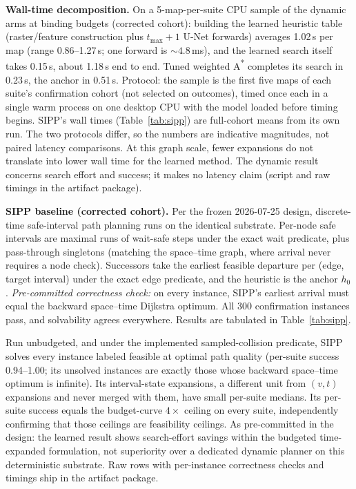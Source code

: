 \documentclass[letterpaper]{article} %
\begin{document}
\textbf{Wall-time decomposition.} On a 5-map-per-suite CPU sample of the dynamic arms at binding budgets (corrected cohort): building the learned heuristic table (raster/feature construction plus $t_{\max}{+}1$ U-Net forwards) averages 1.02\,s per map (range 0.86--1.27\,s; one forward is ${\sim}4.8$\,ms), and the learned search itself takes 0.15\,s, about 1.18\,s end to end. Tuned weighted A\textsuperscript{*} completes its search in 0.23\,s, the anchor in 0.51\,s. Protocol: the sample is the first five maps of each suite's confirmation cohort (not selected on outcomes), timed once each in a single warm process on one desktop CPU with the model loaded before timing begins. SIPP's wall times (Table~\ref{tab:sipp}) are full-cohort means from its own run. The two protocols differ, so the numbers are indicative magnitudes, not paired latency comparisons. At this graph scale, fewer expansions do not translate into lower wall time for the learned method. The dynamic result concerns search effort and success; it makes no latency claim (script and raw timings in the artifact package).

\textbf{SIPP baseline (corrected cohort).} Per the frozen 2026-07-25 design, discrete-time safe-interval path planning runs on the identical substrate. Per-node safe intervals are maximal runs of wait-safe steps under the exact wait predicate, plus pass-through singletons (matching the space--time graph, where arrival never requires a node check). Successors take the earliest feasible departure per (edge, target interval) under the exact edge predicate, and the heuristic is the anchor $h_0$. \emph{Pre-committed correctness check:} on every instance, SIPP's earliest arrival must equal the backward space--time Dijkstra optimum. All 300 confirmation instances pass, and solvability agrees everywhere. Results are tabulated in Table~\ref{tab:sipp}.

Run unbudgeted, and under the implemented sampled-collision predicate, SIPP solves every instance labeled feasible at optimal path quality (per-suite success 0.94--1.00; its unsolved instances are exactly those whose backward space--time optimum is infinite). Its interval-state expansions, a different unit from $(v,t)$ expansions and never merged with them, have small per-suite medians. Its per-suite success equals the budget-curve $4\times$ ceiling on every suite, independently confirming that those ceilings are feasibility ceilings. As pre-committed in the design: the learned result shows search-effort savings within the budgeted time-expanded formulation, not superiority over a dedicated dynamic planner on this deterministic substrate. Raw rows with per-instance correctness checks and timings ship in the artifact package.
\end{document}
